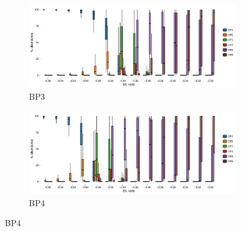 \begin{figure}[h]\ContinuedFloat
\centering

    \begin{subfigure}[b]{\linewidth}
      	\includegraphics[width=1\linewidth]{"figs_ch2/boxplot_ggplot_02bin Bison OF3 iter 999"}
      	\caption{BP3}
        \label{fig:BP3_mc}
    \end{subfigure}
    \begin{subfigure}[b]{\linewidth}
    	\includegraphics[width=1\linewidth]{"figs_ch2/boxplot_ggplot_02bin Bison OF4 iter 999"}
    	\caption{BP4}
        \label{fig:BP4_mc}
    \end{subfigure}
    
\end{figure}
\doublespace



